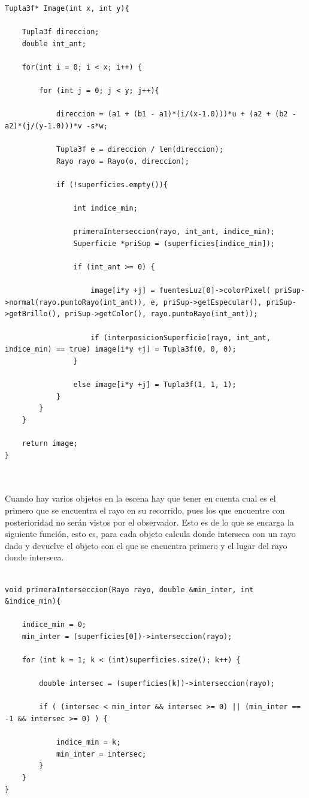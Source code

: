 \begin{lstlisting}[style=Consola]
Tupla3f* Image(int x, int y){

	Tupla3f direccion;
	double int_ant;

	for(int i = 0; i < x; i++) {
	
		for (int j = 0; j < y; j++){
		
			direccion = (a1 + (b1 - a1)*(i/(x-1.0)))*u + (a2 + (b2 - a2)*(j/(y-1.0)))*v -s*w;
			
			Tupla3f e = direccion / len(direccion);
			Rayo rayo = Rayo(o, direccion);

			if (!superficies.empty()){

				int indice_min;

				primeraInterseccion(rayo, int_ant, indice_min);
				Superficie *priSup = (superficies[indice_min]);

				if (int_ant >= 0) {

					image[i*y +j] = fuentesLuz[0]->colorPixel( priSup->normal(rayo.puntoRayo(int_ant)), e, priSup->getEspecular(), priSup->getBrillo(), priSup->getColor(), rayo.puntoRayo(int_ant));

					if (interposicionSuperficie(rayo, int_ant, indice_min) == true) image[i*y +j] = Tupla3f(0, 0, 0);
				}
				
				else image[i*y +j] = Tupla3f(1, 1, 1);
			}
		}
	}
	
	return image;
}


\end{lstlisting}
${ }$\\

Cuando hay varios objetos en la escena hay que tener en cuenta cual es el primero que se encuentra el rayo en su recorrido, pues los que encuentre con posterioridad no serán vistos por el observador. Esto es de lo que se encarga la siguiente función, esto es, para cada objeto calcula donde interseca con un rayo dado y devuelve el objeto con el que se encuentra primero y el lugar del rayo donde interseca.
${ }$\\

\begin{lstlisting}[style=Consola]

void primeraInterseccion(Rayo rayo, double &min_inter, int &indice_min){

	indice_min = 0;
	min_inter = (superficies[0])->interseccion(rayo);

	for (int k = 1; k < (int)superficies.size(); k++) {
	
		double intersec = (superficies[k])->interseccion(rayo);

		if ( (intersec < min_inter && intersec >= 0) || (min_inter == -1 && intersec >= 0) ) {
		
			indice_min = k;
			min_inter = intersec;
		}
	}
}
\end{lstlisting}
${ }$\\

